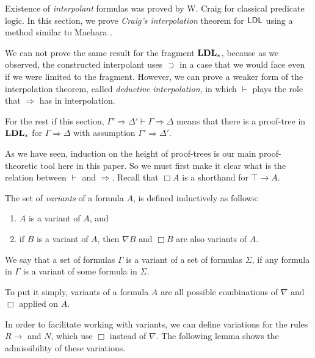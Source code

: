 Existence of \emph{interpolant} formulas was proved by W. Craig \cite{CraigA} for classical predicate logic. In this section, we prove \emph{Craig's interpolation} theorem for $\mathsf{LDL}$ using a method similar to Maehara \cite{maehara1960interpolation}.




We can not prove the same result for the fragment $\mathbf{LDL}_*$, because as we observed, the constructed interpolant uses $\supset$ in a case that we would face even if we were limited to the fragment. However, we can prove a weaker form of the interpolation theorem, called \emph{deductive interpolation}, in which $\vdash$ plays the role that $\Rightarrow$ has in interpolation.

\begin{nota}
  For the rest if this section, $\Gamma' \Rightarrow \Delta' \vdash \Gamma \Rightarrow \Delta$ means that there is a proof-tree in $\mathbf{LDL}_*$ for $\Gamma \Rightarrow \Delta$ with assumption $\Gamma' \Rightarrow \Delta'$.
\end{nota}

As we have seen, induction on the height of proof-trees is our main proof-theoretic tool here in this paper. So we must first make it clear what is the relation between $\vdash$ and $\Rightarrow$. Recall that $\Box A$ is a shorthand for $\top \rightarrow A$.

\begin{dfn}
  The set of \emph{variants} of a formula $A$, is defined inductively as follows:
  \begin{enumerate}
    \item $A$ is a variant of $A$, and
    \item if $B$ is a variant of $A$, then $\nabla B$ and $\Box B$ are also variants of $A$.
  \end{enumerate}
  We say that a set of formulas $\Gamma$ is a variant of a set of formulas $\Sigma$, if any formula in $\Gamma$ is a variant of some formula in $\Sigma$.
\end{dfn}

To put it simply, variants of a formula $A$ are all possible combinations of $\nabla$ and $\Box$ applied on $A$.

In order to facilitate working with variants, we can define variations for the rules $R \rightarrow$ and $N$, which use $\Box$ instead of $\nabla$. The following lemma shows the admissibility of these variations.

